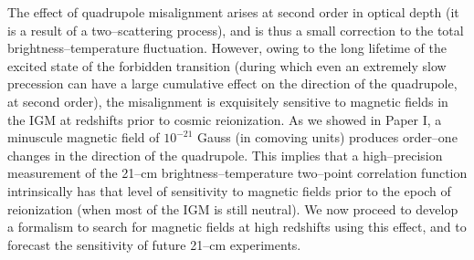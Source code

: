 The effect of quadrupole misalignment arises at second order in optical depth (it is a result of a two--scattering process), and is thus a small correction to the total brightness--temperature fluctuation. However, owing to the long lifetime of the excited state of the forbidden transition (during which even an extremely slow precession can have a large cumulative effect on the direction of the quadrupole, at second order), the misalignment is exquisitely sensitive to magnetic fields in the IGM at redshifts prior to cosmic reionization. As we showed in Paper I, a minuscule magnetic field of  $10^{-21}$ Gauss (in comoving units) produces order--one changes in the direction of the quadrupole. This implies that a high--precision measurement of the 21--cm brightness--temperature two--point correlation function intrinsically has that level of sensitivity to magnetic fields prior to the epoch of reionization (when most of the IGM is still neutral). We now proceed to develop a formalism to search for magnetic fields at high redshifts using this effect, and to forecast the sensitivity of future 21--cm experiments. 